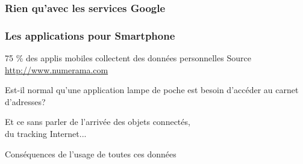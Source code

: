 \documentclass{beamer}
\begin{document}
\begin{frame}
\frametitle{Rien qu'avec les services Google}

\begin{itemize}
\end{itemize}

\end{frame}


\begin{frame}
\frametitle{Les applications pour Smartphone}
\begin{block}{75 \% des applis mobiles collectent des données personnelles}
Source \url{http://www.numerama.com}
\end{block}
Est-il normal qu'une application lampe de poche est besoin d'accéder au carnet d'adresses?
\end{frame}

\begin{frame}
\begin{center}
\Huge{Et ce sans parler de l'arrivée des objets connectés, \\ du tracking Internet... }
\end{center}
\end{frame}


\begin{frame}
\begin{center}
\Huge{Conséquences de l'usage de toutes ces données }
\end{center}
\end{frame}
\end{document}
